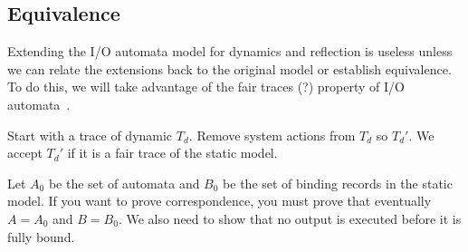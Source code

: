 \subsection{Equivalence}

Extending the I/O automata model for dynamics and reflection is useless unless we can relate the extensions back to the original model or establish equivalence.
To do this, we will take advantage of the fair traces (?) property of I/O automata~\cite{distributed_algorithms}.


Start with a trace of dynamic $T_d$.
Remove system actions from $T_d$ so $T_d'$.
We accept $T_d'$ if it is a fair trace of the static model.

Let $A_0$ be the set of automata and $B_0$ be the set of binding records in the static model.
If you want to prove correspondence, you must prove that eventually $A = A_0$ and $B = B_0$.
We also need to show that no output is executed before it is fully bound.


